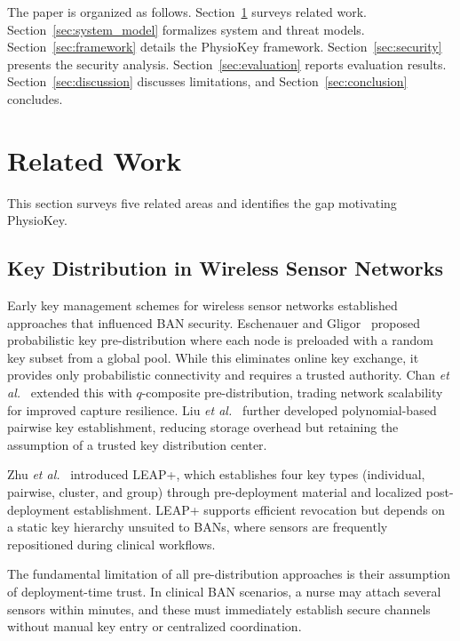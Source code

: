 \documentclass[sensors,article,submit,pdftex,moreauthors]{Definitions/mdpi}
\newcommand{\etal}{\textit{et al.}}
\begin{document}
The paper is organized as follows. Section~\ref{sec:related} surveys related work. Section~\ref{sec:system_model} formalizes system and threat models. Section~\ref{sec:framework} details the PhysioKey framework. Section~\ref{sec:security} presents the security analysis. Section~\ref{sec:evaluation} reports evaluation results. Section~\ref{sec:discussion} discusses limitations, and Section~\ref{sec:conclusion} concludes.


\section{Related Work}
\label{sec:related}

This section surveys five related areas and identifies the gap motivating PhysioKey.

\subsection{Key Distribution in Wireless Sensor Networks}
\label{subsec:key_dist}

Early key management schemes for wireless sensor networks established approaches that influenced BAN security. Eschenauer and Gligor~\cite{eschenauer2002random} proposed probabilistic key pre-distribution where each node is preloaded with a random key subset from a global pool. While this eliminates online key exchange, it provides only probabilistic connectivity and requires a trusted authority. Chan \etal~\cite{chan2003random} extended this with $q$-composite pre-distribution, trading network scalability for improved capture resilience. Liu \etal~\cite{liu2008establishing} further developed polynomial-based pairwise key establishment, reducing storage overhead but retaining the assumption of a trusted key distribution center.

Zhu \etal~\cite{zhu2006leap} introduced LEAP+, which establishes four key types (individual, pairwise, cluster, and group) through pre-deployment material and localized post-deployment establishment. LEAP+ supports efficient revocation but depends on a static key hierarchy unsuited to BANs, where sensors are frequently repositioned during clinical workflows.

The fundamental limitation of all pre-distribution approaches is their assumption of deployment-time trust. In clinical BAN scenarios, a nurse may attach several sensors within minutes, and these must immediately establish secure channels without manual key entry or centralized coordination.
\end{document}
